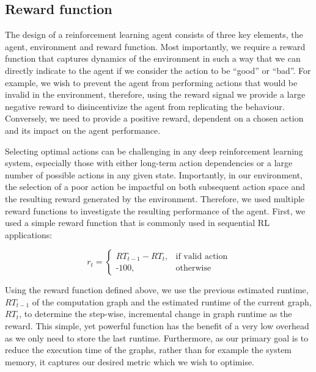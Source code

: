 
\subsection{Reward function}
\label{sec:prob:subsec:rwd}
The design of a reinforcement learning agent consists of three key elements, the agent, environment and reward function. Most importantly, we require a reward function that captures dynamics of the environment in such a way that we can directly indicate to the agent if we consider the action to be ``good'' or ``bad''. For example, we wish to prevent the agent from performing actions that would be invalid in the environment, therefore, using the reward signal we provide a large negative reward to disincentivize the agent from replicating the behaviour. Conversely, we need to provide a positive reward, dependent on a chosen action and its impact on the agent performance.

Selecting optimal actions can be challenging in any deep reinforcement learning system, especially those with either long-term action dependencies or a large number of possible actions in any given state. Importantly, in our environment, the selection of a poor action be impactful on both subsequent action space and the resulting reward generated by the environment. Therefore, we used multiple reward functions to investigate the resulting performance of the agent. First, we used a simple reward function that is commonly used in sequential RL applications:

$$
r_t =
\begin{cases}
  RT_{t-1} - RT_t, & \text{if valid action}\\
  \text{-}100,            & \text{otherwise}
\end{cases}
$$

Using the reward function defined above, we use the previous estimated runtime, $RT_{t-1}$ of the computation graph and the estimated runtime of the current graph, $RT_t$, to determine the step-wise, incremental change in graph runtime as the reward. This simple, yet powerful function has the benefit of a very low overhead as we only need to store the last runtime. Furthermore, as our primary goal is to reduce the execution time of the graphs, rather than for example the system memory, it captures our desired metric which we wish to optimise.

